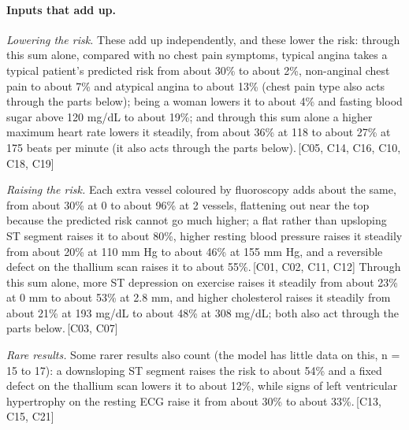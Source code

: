 \documentclass[a4paper,10pt]{article}
\newif\ifreviewmarks
\newcommand{\reviewrule}{\noindent{\color{BrickRed}\rule{\linewidth}{0.8pt}}}
\newenvironment{drafted}[1][]{%
  \ifreviewmarks\par\addvspace{\medskipamount}\reviewrule\par\nopagebreak
  \noindent{\color{BrickRed}\sffamily\footnotesize\textbf{Thesis Draft}\quad #1\hfill review}\par\nopagebreak\smallskip\fi}{%
  \ifreviewmarks\par\smallskip\noindent{\color{BrickRed}\sffamily\footnotesize end of thesis draft}\par\nopagebreak\reviewrule\par\medskip\fi}
\begin{document}
\begin{drafted}[plain-language layer: heart-s2-c3]
\paragraph{Inputs that add up.} \par\noindent\textit{Lowering the risk.}  These add up independently, and these lower the risk: through this sum alone, compared with no chest pain symptoms, typical angina takes a typical patient's predicted risk from about 30\% to about 2\%, non-anginal chest pain to about 7\% and atypical angina to about 13\% (chest pain type also acts through the parts below); being a woman lowers it to about 4\% and fasting blood sugar above 120 mg/dL to about 19\%; and through this sum alone a higher maximum heart rate lowers it steadily, from about 36\% at 118 to about 27\% at 175 beats per minute (it also acts through the parts below).\,{\scriptsize\textcolor{NavyBlue}{[C05, C14, C16, C10, C18, C19]}} \par\noindent\textit{Raising the risk.}  Each extra vessel coloured by fluoroscopy adds about the same, from about 30\% at 0 to about 96\% at 2 vessels, flattening out near the top because the predicted risk cannot go much higher; a flat rather than upsloping ST segment raises it to about 80\%, higher resting blood pressure raises it steadily from about 20\% at 110 mm Hg to about 46\% at 155 mm Hg, and a reversible defect on the thallium scan raises it to about 55\%.\,{\scriptsize\textcolor{NavyBlue}{[C01, C02, C11, C12]}} Through this sum alone, more ST depression on exercise raises it steadily from about 23\% at 0 mm to about 53\% at 2.8 mm, and higher cholesterol raises it steadily from about 21\% at 193 mg/dL to about 48\% at 308 mg/dL; both also act through the parts below.\,{\scriptsize\textcolor{NavyBlue}{[C03, C07]}} \par\noindent\textit{Rare results.}  Some rarer results also count (the model has little data on this, n = 15 to 17): a downsloping ST segment raises the risk to about 54\% and a fixed defect on the thallium scan lowers it to about 12\%, while signs of left ventricular hypertrophy on the resting ECG raise it from about 30\% to about 33\%.\,{\scriptsize\textcolor{NavyBlue}{[C13, C15, C21]}}

\end{drafted}
\end{document}
